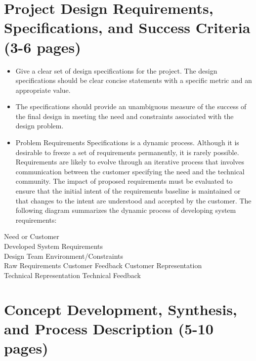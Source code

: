 \documentclass[12pt]{article}
\begin{document}
\section{Project Design Requirements, Specifications, and Success Criteria (3-6 pages)}
\begin{itemize}[noitemsep]
    \item Give a clear set of design specifications for the project. The design specifications should be clear concise statements with a specific metric and an appropriate value.
    \item The specifications should provide an unambiguous measure of the success of the final design in meeting the need and constraints associated with the design problem.
    \item Problem Requirements Specifications is a dynamic process. Although it is desirable to freeze a set of requirements permanently, it is rarely possible. Requirements are likely to evolve through an iterative process that involves communication between the customer specifying the need and the technical community. The impact of proposed requirements must be evaluated to ensure that the initial intent of the requirements baseline is maintained or that changes to the intent are understood and accepted by the customer. The following diagram summarizes the dynamic process of developing system requirements:
\end{itemize}

\begin{center}
Need or Customer \\
Developed System Requirements \\
Design Team Environment/Constraints \\
Raw Requirements \quad Customer Feedback \quad Customer Representation \\
Technical Representation \quad Technical Feedback
\end{center}

\section{Concept Development, Synthesis, and Process Description (5-10 pages)}
\end{document}

